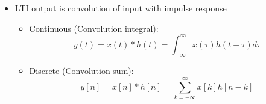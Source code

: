 \documentclass[conference]{IEEEtran}
\begin{document}
\begin{itemize}
  \item LTI output is convolution of input with impulse response
  \begin{itemize}
    \item Continuous (Convolution integral):
    $$
      y(t) = x(t) * h(t) = \int_{-\infty}^\infty x(\tau)h(t-\tau) d\tau
    $$
    \item Discrete (Convolution sum):
    $$
      y[n] = x[n] * h[n] = \sum_{k=-\infty}^\infty x[k]h[n-k]
    $$
  \end{itemize}
\end{itemize}










\end{document}
